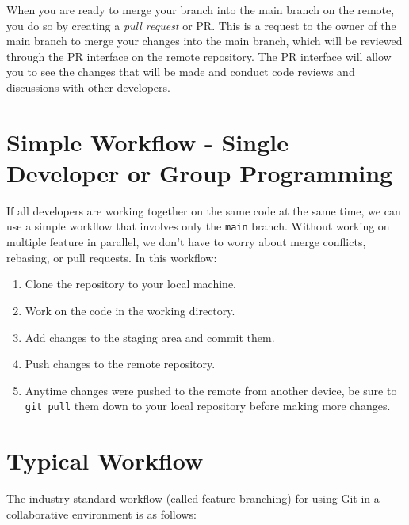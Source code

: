 \documentclass[fleqn]{article}
\begin{document}
When you are ready to merge your branch into the main branch on the remote, you
do so by creating a \emph{pull request} or PR. This is a request to the owner
of the main branch to merge your changes into the main branch, which will be
reviewed through the PR interface on the remote repository. The PR interface
will allow you to see the changes that will be made and conduct code reviews and
discussions with other developers.

\pagebreak

\section*{Simple Workflow - Single Developer or Group Programming}

If all developers are working together on the same code at the same time, we can
use a simple workflow that involves only the \texttt{main} branch. Without
working on multiple feature in parallel, we don't have to worry about merge
conflicts, rebasing, or pull requests. In this workflow:

\begin{enumerate}
    \item Clone the repository to your local machine.
    \item Work on the code in the working directory.
    \item Add changes to the staging area and commit them.
    \item Push changes to the remote repository.
    \item Anytime changes were pushed to the remote from another device, be sure
          to \texttt{git pull} them down to your local repository before making
          more changes.
\end{enumerate}

\section*{Typical Workflow}

The industry-standard workflow (called feature branching) for using Git in a
collaborative environment is as follows:
\end{document}
